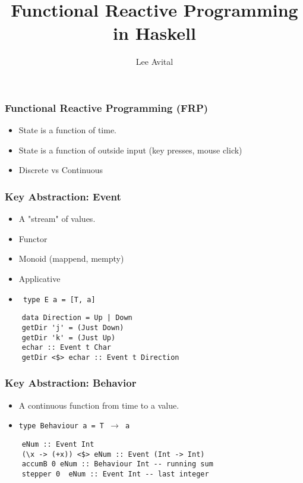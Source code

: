 \documentclass{beamer}
\title{Functional Reactive Programming in Haskell}
\author{Lee Avital}
\begin{document}
\maketitle

\begin{frame}
  \frametitle{Functional Reactive Programming (FRP)}

  \begin{itemize}
    \item State is a function of time.
    \item State is a function of outside input (key presses, mouse click)
    \item Discrete vs Continuous
  \end{itemize}
\end{frame}

\begin{frame}[fragile]
  \frametitle{Key Abstraction: Event}


  \begin{itemize}
    \item A "stream" of values.
    \item Functor
    \item Monoid (mappend, mempty)
    \item Applicative
    \item \texttt{ type E a = [T, a] }
  \end{itemize}

  \begin{Verbatim}
    data Direction = Up | Down
    getDir 'j' = (Just Down)
    getDir 'k' = (Just Up)
    echar :: Event t Char
    getDir <$> echar :: Event t Direction
  \end{Verbatim}

\end{frame}




\begin{frame}[fragile]
  \frametitle{Key Abstraction: Behavior}

  \begin{itemize}
    \item A continuous function from time to a value.
    \item \texttt{type Behaviour a = T $\rightarrow$  a}
  \end{itemize}
  \begin{Verbatim}
    eNum :: Event Int
    (\x -> (+x)) <$> eNum :: Event (Int -> Int)
    accumB 0 eNum :: Behaviour Int -- running sum
    stepper 0  eNum :: Event Int -- last integer
  \end{Verbatim}
\end{frame}
\end{document}
